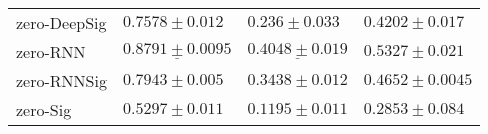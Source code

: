 \begin{tabular}{llll}
zero-DeepSig   &                            $ 0.7578 \pm 0.012 $ &                            $ 0.236 \pm 0.033 $ &                           $ 0.4202 \pm 0.017 $ \\
zero-RNN       &            $  \underline{ 0.8791 \pm 0.0095 } $ &            $  \underline{ 0.4048 \pm 0.019 } $ &                           $ 0.5327 \pm 0.021 $ \\
zero-RNNSig    &                            $ 0.7943 \pm 0.005 $ &                           $ 0.3438 \pm 0.012 $ &                          $ 0.4652 \pm 0.0045 $ \\
zero-Sig       &                            $ 0.5297 \pm 0.011 $ &                           $ 0.1195 \pm 0.011 $ &                           $ 0.2853 \pm 0.084 $ \\
\bottomrule
\end{tabular}
